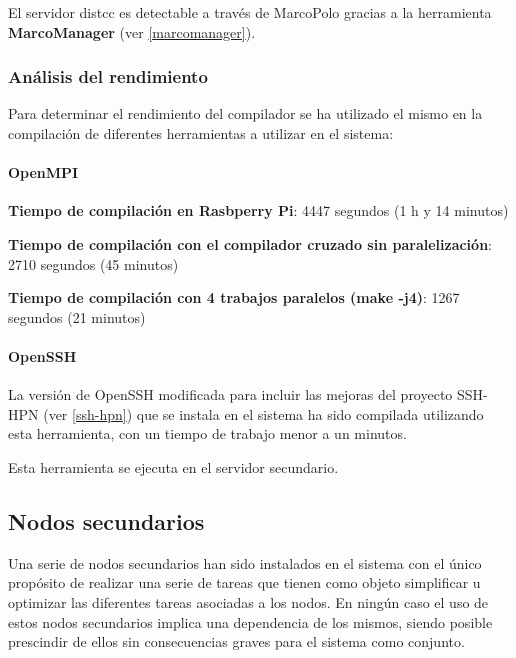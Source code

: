 El servidor distcc es detectable a través de MarcoPolo gracias a la herramienta \textbf{MarcoManager} (ver \ref{marcomanager}).

\subsubsection{Análisis del rendimiento\\}
\label{distcc:performance}

Para determinar el rendimiento del compilador se ha utilizado el mismo en la compilación de diferentes herramientas a utilizar en el sistema:

\paragraph{OpenMPI\\}

\textbf{Tiempo de compilación en Rasbperry Pi}: 4447 segundos (1 h y 14 minutos)

\textbf{Tiempo de compilación con el compilador cruzado sin paralelización}: 2710 segundos (45 minutos)

\textbf{Tiempo de compilación con 4 trabajos paralelos (make -j4)}: 1267 segundos (21 minutos)

\paragraph{OpenSSH\\}

La versión de OpenSSH modificada para incluir las mejoras del proyecto SSH-HPN (ver \ref{ssh-hpn}) que se instala en el sistema ha sido compilada utilizando esta herramienta, con un tiempo de trabajo menor a un minutos.

\vspace{1cm}

Esta herramienta se ejecuta en el servidor secundario.

\subsection{Nodos secundarios}

Una serie de nodos secundarios han sido instalados en el sistema con el único propósito de realizar una serie de tareas que tienen como objeto simplificar u optimizar las diferentes tareas asociadas a los nodos. En ningún caso el uso de estos nodos secundarios implica una dependencia de los mismos, siendo posible prescindir de ellos sin consecuencias graves para el sistema como conjunto.

